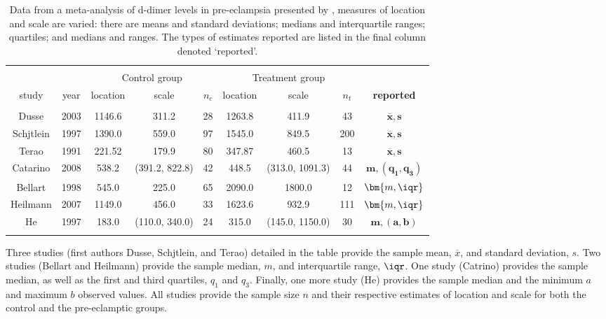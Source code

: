 \documentclass{article}
\begin{document}
\begin{table}[!htbp] \centering
  \small
\begin{tabular}{@{\extracolsep{5pt}} ccccccccc}
\\[-1.8ex]\hline
\hline \\[-1.8ex]
& & \multicolumn{3}{c}{Control group} & \multicolumn{3}{c}{Treatment group} & \\ \cline{3-5} \cline{6-8}
study & year & location & scale & $n_c$ & location & scale & $n_t$ &
\bf{reported} \\
\hline \\[-1.8ex]
Dusse &2003 & 1146.6 & 311.2 & 28 & 1263.8 & 411.9 & 43 & $\bm{\overline x, s}$  \\
Schjtlein &1997 & 1390.0 & 559.0 & 97 & 1545.0 & 849.5 & 200 & $\bm{\overline x, s}$  \\
Terao &1991 & 221.52 & 179.9 & 80 & 347.87 & 460.5 & 13 & $\bm{\overline x, s}$  \\
Catarino &2008 & 538.2 & (391.2, 822.8) & 42 & 448.5  & (313.0, 1091.3) & 44 & $\bm{m, (q_1, q_3)}$ \\
Bellart &1998 & 545.0 & 225.0 & 65 & 2090.0 & 1800.0 & 12 & $\bm{m, \iqr}$ \\
Heilmann &2007 & 1149.0 & 456.0 & 33 & 1623.6 & 932.9 & 111 & $\bm{m, \iqr}$ \\
He & 1997 & 183.0 & (110.0, 340.0) & 24 & 315.0 & (145.0, 1150.0) & 30 & $\bm{m, (a, b)}$\\
\hline \\[-1.8ex]
\end{tabular}
\caption{Data from a meta-analysis of d-dimer levels in pre-eclampsia presented by \cite{Pinheiro2012}, measures of location and scale are varied: there are means and standard deviations; medians and interquartile ranges; quartiles; and medians and ranges. The types of estimates reported are listed in the final column denoted `reported'.}
  \label{tab: pinheiro}
\end{table}

Three studies (first authors Dusse, Schjtlein, and Terao) detailed in the table provide the sample mean, $\overline x$, and standard deviation, $s$. Two studies (Bellart and Heilmann) provide the sample median, $m$, and interquartile range, $\iqr$. One study (Catrino) provides the sample median, as well as the first and third quartiles, $q_1$ and $q_3$. Finally, one more study (He) provides the sample median and the minimum $a$ and maximum $b$ observed values. All studies provide the sample size $n$ and their respective estimates of location and scale for both the control and the pre-eclamptic groups.
\end{document}

